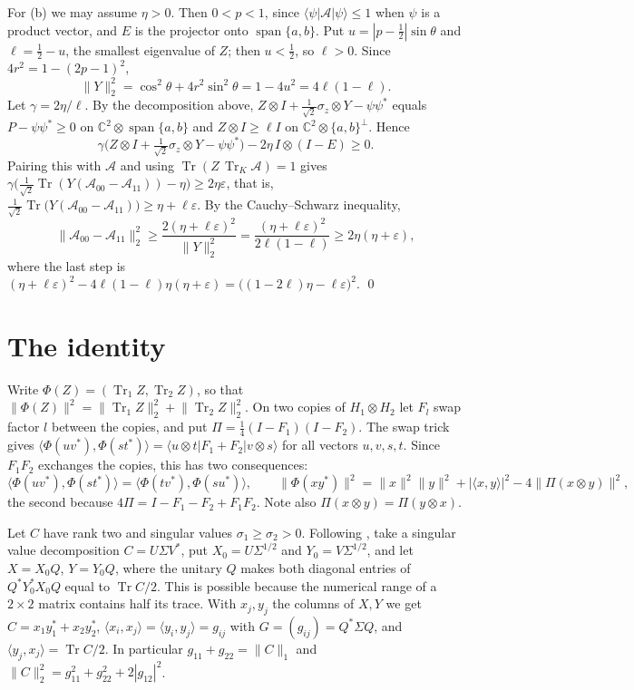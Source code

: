 \documentclass[11pt]{article}
\theoremstyle{remark}
\newcommand{\Tr}{\operatorname{Tr}}
\newcommand{\norm}[1]{\lVert #1\rVert}
\begin{document}
For (b) we may assume $\eta>0$. Then $0<p<1$, since $\langle\psi|\mathcal A|\psi\rangle\le1$ when $\psi$ is a product
vector, and $E$ is the projector onto $\operatorname{span}\{a,b\}$. Put $u=|p-\frac12|\sin\theta$ and $\ell=\frac12-u$,
the smallest eigenvalue of $Z$; then $u<\frac12$, so $\ell>0$. Since $4r^2=1-(2p-1)^2$,
\[
\norm{Y}_2^2=\cos^2\theta+4r^2\sin^2\theta=1-4u^2=4\ell(1-\ell).
\]
Let $\gamma=2\eta/\ell$. By the decomposition above, $Z\otimes I+\frac1{\sqrt2}\sigma_z\otimes Y-\psi\psi^*$ equals
$P-\psi\psi^*\ge0$ on $\mathbb C^2\otimes\operatorname{span}\{a,b\}$ and $Z\otimes I\ge\ell I$ on
$\mathbb C^2\otimes\{a,b\}^\perp$. Hence
\[
\gamma\Big(Z\otimes I+\tfrac1{\sqrt2}\sigma_z\otimes Y-\psi\psi^*\Big)-2\eta\,I\otimes(I-E)\ge0 .
\]
Pairing this with $\mathcal A$ and using $\Tr(Z\,\Tr_K\mathcal A)=1$ gives
$\gamma\big(\frac1{\sqrt2}\Tr(Y(\mathcal A_{00}-\mathcal A_{11}))-\eta\big)\ge2\eta\varepsilon$, that is,
$\frac1{\sqrt2}\Tr\big(Y(\mathcal A_{00}-\mathcal A_{11})\big)\ge\eta+\ell\varepsilon$. By the Cauchy--Schwarz inequality,
\[
\norm{\mathcal A_{00}-\mathcal A_{11}}_2^2\ge\frac{2(\eta+\ell\varepsilon)^2}{\norm{Y}_2^2}
=\frac{(\eta+\ell\varepsilon)^2}{2\ell(1-\ell)}\ge2\eta(\eta+\varepsilon),
\]
where the last step is $(\eta+\ell\varepsilon)^2-4\ell(1-\ell)\eta(\eta+\varepsilon)=\big((1-2\ell)\eta-\ell\varepsilon\big)^2$.
\qed

\section{The identity}\label{sec:sos}

Write $\Phi(Z)=(\Tr_1Z,\Tr_2Z)$, so that $\norm{\Phi(Z)}^2=\norm{\Tr_1Z}_2^2+\norm{\Tr_2Z}_2^2$. On two copies of
$H_1\otimes H_2$ let $F_l$ swap factor $l$ between the copies, and put $\Pi=\frac14(I-F_1)(I-F_2)$. The swap trick gives
$\langle\Phi(uv^*),\Phi(st^*)\rangle=\langle u\otimes t|F_1+F_2|v\otimes s\rangle$ for all vectors $u,v,s,t$. Since
$F_1F_2$ exchanges the copies, this has two consequences:
\begin{equation}\label{eq:two}
\langle\Phi(uv^*),\Phi(st^*)\rangle=\langle\Phi(tv^*),\Phi(su^*)\rangle,\qquad
\norm{\Phi(xy^*)}^2=\norm{x}^2\norm{y}^2+|\langle x,y\rangle|^2-4\norm{\Pi(x\otimes y)}^2 ,
\end{equation}
the second because $4\Pi=I-F_1-F_2+F_1F_2$. Note also $\Pi(x\otimes y)=\Pi(y\otimes x)$.

Let $C$ have rank two and singular values $\sigma_1\ge\sigma_2>0$. Following \cite{FHPV}, take a singular value
decomposition $C=U\Sigma V^*$, put $X_0=U\Sigma^{1/2}$ and $Y_0=V\Sigma^{1/2}$, and let $X=X_0Q$, $Y=Y_0Q$, where the
unitary $Q$ makes both diagonal entries of $Q^*Y_0^*X_0Q$ equal to $\Tr C/2$. This is possible because the numerical range
of a $2\times2$ matrix contains half its trace. With $x_j,y_j$ the columns of $X,Y$ we get $C=x_1y_1^*+x_2y_2^*$,
$\langle x_i,x_j\rangle=\langle y_i,y_j\rangle=g_{ij}$ with $G=(g_{ij})=Q^*\Sigma Q$, and
$\langle y_j,x_j\rangle=\Tr C/2$. In particular $g_{11}+g_{22}=\norm{C}_1$ and $\norm{C}_2^2=g_{11}^2+g_{22}^2+2|g_{12}|^2$.
\end{document}
